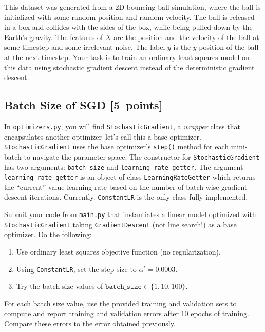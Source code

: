 \documentclass{article}
\newcommand{\blu}[1]{{\textcolor{blu}{#1}}}
\let\ask\blu
\newcommand\pts[1]{\textcolor{pointscolour}{[#1~points]}}
\begin{document}
This dataset was generated from a 2D bouncing ball simulation, where the ball is initialized with some random position and random velocity. The ball is released in a box and collides with the sides of the box, while being pulled down by the Earth's gravity. The features of $X$ are the position and the velocity of the ball at some timestep and some irrelevant noise. The label $y$ is the $y$-position of the ball at the next timestep. Your task is to train an ordinary least squares model on this data using stochastic gradient descent instead of the deterministic gradient descent.

\subsection{Batch Size of SGD \pts{5}}

In \texttt{optimizers.py}, you will find \texttt{StochasticGradient}, a \textit{wrapper} class that encapsulates another optimizer--let's call this a base optimizer.
\texttt{StochasticGradient} uses the base optimizer's \texttt{step()} method for each mini-batch to navigate the parameter space.
The constructor for \texttt{StochasticGradient} has two arguments: \texttt{batch\_size} and \texttt{learning\_rate\_getter}. The argument \texttt{learning\_rate\_getter} is an object of class \texttt{LearningRateGetter} which returns the ``current'' value learning rate based on the number of batch-wise gradient descent iterations. Currently. \texttt{ConstantLR} is the only class fully implemented.

\ask{Submit your code} from \texttt{main.py} that instantiates a linear model optimized with \texttt{StochasticGradient} taking \texttt{GradientDescent} (not line search!) as a base optimizer. Do the following:
\begin{enumerate}
        \item Use ordinary least squares objective function (no regularization).
        \item Using \texttt{ConstantLR}, set the step size to $\alpha^t = 0.0003$.
        \item Try the batch size values of $\texttt{batch\_size} \in \{1, 10, 100\}$.
\end{enumerate}
\ask{For each batch size value, use the provided training and validation sets to compute and report training and validation errors after 10 epochs of training. Compare these errors to the error obtained previously.}
\end{document}

